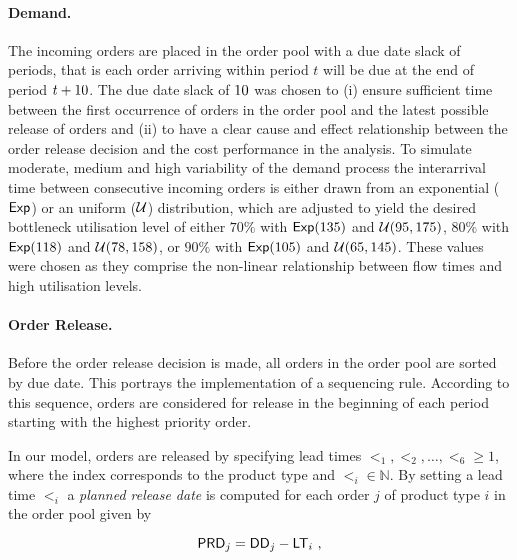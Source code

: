 \documentclass[envcountsame]{llncs}
\begin{document}
\paragraph{Demand.} The incoming orders are placed in the order pool with a due date slack of
\dds{} periods, that is each order arriving within period $t$ will be due at the end of period
$t+10{}$. The due date slack of \(10{}\) was chosen to (i) ensure sufficient time between the
first occurrence of orders in the order pool and the latest possible release of orders and (ii) to
have a clear cause and effect relationship between the order release decision and the cost
performance in the analysis.
%
To simulate moderate, medium and high variability of the demand process the interarrival time
between consecutive incoming orders is either drawn from an exponential ($\mathsf{Exp}$) or an uniform
($\mathcal{U}$) distribution, which are adjusted to yield the desired bottleneck utilisation level of
either $70\%$ with $\mathsf{Exp}(135)$ and $\mathcal{U}(95,175)$, $80\%$ with $\mathsf{Exp}(118)$ and $\mathcal{U}(78,158)$, or
$90\%$ with $\mathsf{Exp}(105)$ and $\mathcal{U}(65,145)$. These values were chosen as they comprise the
non-linear relationship between flow times and high utilisation levels.

\paragraph{Order Release.}
%
Before the order release decision is made, all orders in the order pool are sorted by due date. This
portrays the implementation of a sequencing rule. According to this sequence, orders are considered
for release in the beginning of each period starting with the highest priority order.

In our model, orders are released by specifying lead times
$\lt_{1}, \lt_{2}, \ldots, \lt_{6} \geqslant 1$, where the index corresponds to the product type and
$\lt_{i} \in \mathbb{N}$.
%
%
By setting a lead time $\lt_{i}$ a \emph{planned release date} is computed for each
order $j$ of product type $i$ in the order pool given by
%
\begin{linenomath*}
  \begin{equation}
    \mathsf{PRD}{}_j= \mathsf{DD}{}_j - \mathsf{LT}_{i}\ ,
    \label{eq:Orel}
  \end{equation}
\end{linenomath*}
\end{document}
